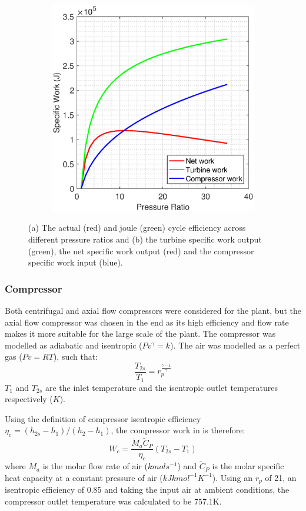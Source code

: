 \begin{figure} [h]
\begin{subfigure}{.7\textwidth}
 \includegraphics[width=0.9\linewidth]{./pictures/network.eps}
 \label{fig:sub2}
\end{subfigure}
\caption{(a) The actual (red) and joule (green) cycle efficiency across different pressure ratios and (b) the turbine specific work output (green), the net specific work output (red) and the compressor specific work input (blue).}
\label{fig:efficiencysimple}
\end{figure} 

\subsubsection{Compressor} \label{ssec:compressor}
Both centrifugal and axial flow compressors were considered for the plant, but the axial flow compressor was chosen in the end as its high efficiency and flow rate makes it more suitable for the large scale of the plant. The compressor was modelled as adiabatic and isentropic ($Pv^{\gamma} = k$). The air was modelled as a perfect gas ($Pv = RT$), such that:
\begin{equation}
\frac{T_{2s}}{T_1} = r_p^{\frac{\gamma-1}{\gamma}}
\end{equation}
$T_{1}$ and $T_{2s}$ are the inlet temperature and the isentropic outlet temperatures respectively ($K$).

Using the definition of compressor isentropic efficiency $\eta_c = (h_{2s} - h_1)/(h_2 - h_1) $, the compressor work in is therefore:
\begin{equation}
W_{c} = \frac {\dot{M}_a \tilde{C}_P}{\eta_c} (T_{2s} - T_1)
\end{equation}
where $\dot{M}_a$ is the molar flow rate of air ($kmols^{-1}$) and $\tilde{C}_P$ is the molar specific heat capacity at a constant pressure of air ($kJkmol^{-1}K^{-1}$). Using an $r_p$ of 21, an isentropic efficiency of 0.85 \cite{website:compressoreff} and taking the input air at ambient conditions, the compressor outlet temperature was calculated to be 757.1K.  

